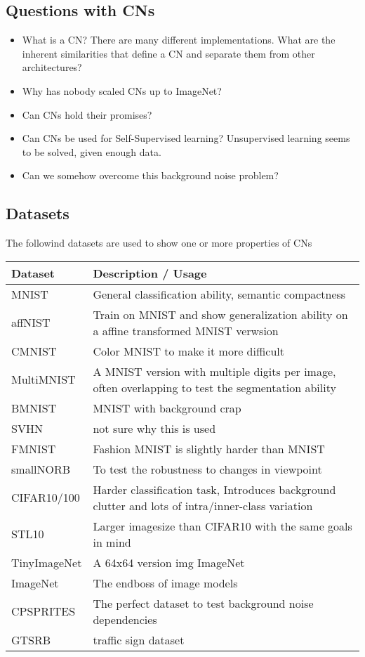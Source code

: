 \documentclass{article}
\begin{document}
\subsection{Questions with CNs}
\begin{itemize}
	\item What is a CN? There are many different implementations. What are the inherent similarities that define a CN and separate them from other architectures?
	\item Why has nobody scaled CNs up to ImageNet?
	\item Can CNs hold their promises?
	\item Can CNs be used for Self-Supervised learning? Unsupervised learning seems to be solved, given enough data.
	\item Can we somehow overcome this background noise problem?
\end{itemize}
\subsection{Datasets}
The followind datasets are used to show one or more properties of CNs

\begin{tabular}{ll}
	Dataset     & Description / Usage \\
	\hline
	MNIST       & General classification ability, semantic compactness \\
	affNIST     & Train on MNIST and show generalization ability on a affine transformed MNIST verwsion \\
	CMNIST      & Color MNIST to make it more difficult \\
	MultiMNIST  & A MNIST version with multiple digits per image, often overlapping to test the segmentation ability \\
	BMNIST      & MNIST with background crap \\
	SVHN        & not sure why this is used \\
	FMNIST      & Fashion MNIST is slightly harder than MNIST \\
	smallNORB   & To test the robustness to changes in viewpoint \\
	CIFAR10/100 & Harder classification task, Introduces background clutter and lots of intra/inner-class variation \\
	STL10       & Larger imagesize than CIFAR10 with the same goals in mind \\
	TinyImageNet& A 64x64 version img ImageNet \\
	ImageNet    & The endboss of image models \\
	CPSPRITES   & The perfect dataset to test background noise dependencies \\
	GTSRB		& traffic sign dataset \\
\end{tabular}
\end{document}

